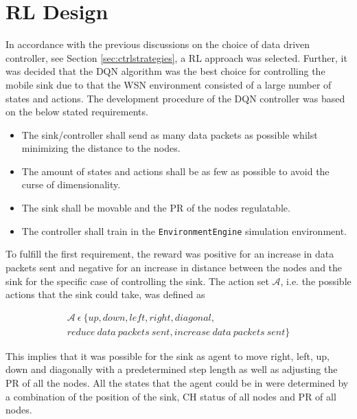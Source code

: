 \newpage

\section{RL Design}

\noindent In accordance with the previous discussions on the choice of data driven controller, see Section \ref{sec:ctrlstrategies}, a RL approach was selected. Further, it was decided that the DQN algorithm was the best choice for controlling the mobile sink due to that the WSN environment consisted of a large number of states and actions. The development procedure of the DQN controller was based on the below stated requirements. \newline

\begin{itemize}
    \item The sink/controller shall send as many data packets as possible whilst minimizing the distance to the nodes. 
    \item The amount of states and actions shall be as few as possible to avoid the curse of dimensionality.
    \item The sink shall be movable and the PR of the nodes regulatable.
    \item The controller shall train in the \verb!EnvironmentEngine! simulation environment.
\end{itemize}

\noindent To fulfill the first requirement, the reward was positive for an increase in data packets sent and negative for an increase in distance between the nodes and the sink for the specific case of controlling the sink. The action set $\mathcal{A}$, i.e. the possible actions that the sink could take, was defined as

\begin{equation*}
\begin{multlined}
    \mathcal{A}\:\epsilon\:\{up, down, left, right, diagonal, \\ reduce\:data\:packets\:sent, increase\:data\:packets\:sent\}  
\end{multlined}
\end{equation*}


 \noindent This implies that it was possible for the sink as agent to move right, left, up, down and diagonally with a predetermined step length as well as adjusting the PR of all the nodes. All the states that the agent could be in were determined by a combination of the position of the sink, CH status of all nodes and PR of all nodes. \newline

